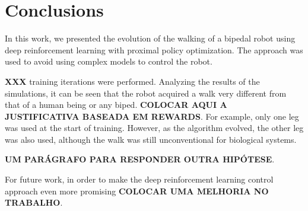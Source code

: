 \section{Conclusions}

In this work, we presented the evolution of the walking of a bipedal robot using deep reinforcement learning with proximal policy optimization. The approach was used to avoid using complex models to control the robot.

\textbf{XXX} training iterations were performed. Analyzing the results of the simulations, it can be seen that the robot acquired a walk very different from that of a human being or any biped. \textbf{COLOCAR AQUI A JUSTIFICATIVA BASEADA EM REWARDS}. For example, only one leg was used at the start of training. However, as the algorithm evolved, the other leg was also used, although the walk was still unconventional for biological systems.

\textbf{UM PARÁGRAFO PARA RESPONDER OUTRA HIPÓTESE}.

For future work,  in order to make the deep reinforcement learning control approach even more promising \textbf{COLOCAR UMA MELHORIA NO TRABALHO}.
